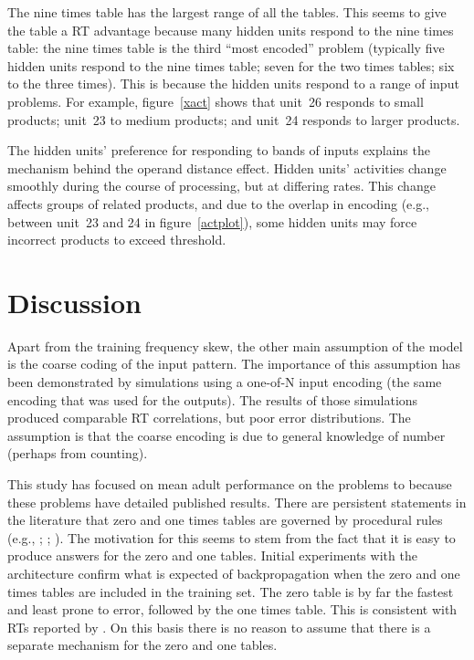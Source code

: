 The nine times table has the largest range of all the tables. This seems to
give the table a RT advantage because many hidden units respond
to the nine times table: the nine times table is the third ``most encoded''
problem (typically five hidden units respond to the nine times table; seven
for the two times tables; six to the three times). This is because the
hidden units respond to a range of input problems.  For example,
figure~\ref{xact} shows that unit~26 responds to small products; unit~23 to
medium products; and unit~24 responds to larger products. %



The hidden units' preference for responding to bands of inputs explains the
mechanism behind the operand distance effect. Hidden units' activities
change smoothly during the course of processing, but at differing rates.
This change affects groups of related products, and due to the overlap in
encoding (e.g., between unit~23 and 24 in figure~\ref{actplot}), some
hidden units may force incorrect products to exceed threshold.


\section*{Discussion}
Apart from the training frequency skew, the other main
assumption of the model is the coarse coding of the input pattern.  The
importance of this assumption has been demonstrated by simulations using a
one-of-N input encoding (the same encoding that was used for the outputs).
The results of those simulations produced comparable RT correlations, but
poor error distributions.  The assumption is that the coarse encoding is
due to general knowledge of number (perhaps from counting).

This study has focused on mean adult performance on the problems 
to  because these problems have detailed published results. There are
persistent statements in the literature that zero and one times tables are
governed by procedural rules (e.g., ;
; ). The motivation for this
seems to stem from the fact that it is easy to produce answers for the zero
and one tables. Initial experiments with the architecture confirm what is
expected of backpropagation when the zero and one times tables are included
in the training set. The zero table is by far the fastest and least prone
to error, followed by the one times table.  This is consistent with RTs
reported by .  On this basis there is no reason to assume
that there is a separate mechanism for the zero and one tables.

